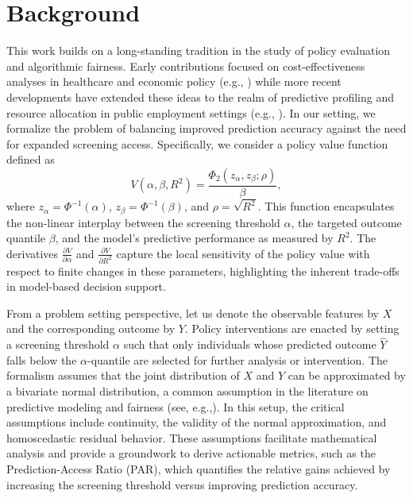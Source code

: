 \documentclass{article} %
\begin{document}
\section{Background}
This work builds on a long-standing tradition in the study of policy evaluation and algorithmic fairness. Early contributions focused on cost-effectiveness analyses in healthcare and economic policy (e.g., \cite{xiong2024costeffectiveness}) while more recent developments have extended these ideas to the realm of predictive profiling and resource allocation in public employment settings (e.g., \cite{kern2021fairness}). In our setting, we formalize the problem of balancing improved prediction accuracy against the need for expanded screening access. Specifically, we consider a policy value function defined as 
\[
V(\alpha,\beta,R^2)=\frac{\Phi_2(z_\alpha,z_\beta;\rho)}{\beta},
\]
where \(z_\alpha=\Phi^{-1}(\alpha)\), \(z_\beta=\Phi^{-1}(\beta)\), and \(\rho=\sqrt{R^2}\). This function encapsulates the non-linear interplay between the screening threshold \(\alpha\), the targeted outcome quantile \(\beta\), and the model's predictive performance as measured by \(R^2\). The derivatives \(\frac{\partial V}{\partial\alpha}\) and \(\frac{\partial V}{\partial R^2}\) capture the local sensitivity of the policy value with respect to finite changes in these parameters, highlighting the inherent trade-offs in model-based decision support.

From a problem setting perspective, let us denote the observable features by \(X\) and the corresponding outcome by \(Y\). Policy interventions are enacted by setting a screening threshold \(\alpha\) such that only individuals whose predicted outcome \( \hat{Y} \) falls below the \(\alpha\)-quantile are selected for further analysis or intervention. The formalism assumes that the joint distribution of \(X\) and \(Y\) can be approximated by a bivariate normal distribution, a common assumption in the literature on predictive modeling and fairness (see, e.g.,\cite{huang2025model}). In this setup, the critical assumptions include continuity, the validity of the normal approximation, and homoscedastic residual behavior. These assumptions facilitate mathematical analysis and provide a groundwork to derive actionable metrics, such as the Prediction-Access Ratio (PAR), which quantifies the relative gains achieved by increasing the screening threshold versus improving prediction accuracy.
\end{document}
